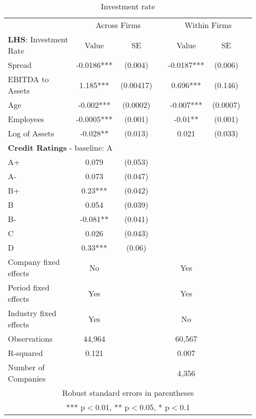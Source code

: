 \documentclass[12pt]{article}
\begin{document}
\author{Barnabás Székely}
\date{\today}
\vspace{-1in}

\begin{table}[H]
    \centering
    \caption{Investment rate}
    \small
    \label{tab:your_table_label}
    \begin{tabular}{lcccccc}
    \toprule
    & \multicolumn{3}{c}{Across Firms} & \multicolumn{3}{c}{Within Firms} \\
    \cmidrule(lr){2-4} \cmidrule(lr){5-7}
    \textbf{LHS}: Investment Rate & Value & SE & & Value & SE & \\
    \midrule
    Spread & -0.0186*** & (0.004) & & -0.0187*** & (0.006) & \\
    EBITDA to Assets & 1.185*** & (0.00417) & &  0.696*** & (0.146) & \\
    Age & -0.002*** & (0.0002) & & -0.007*** & (0.0007) & \\
    Employees & -0.0005*** & (0.001) & & -0.01** & (0.001) & \\
    Log of Assets & -0.028** & (0.013) & & 0.021 &  (0.033) & \vspace*{3mm} \\
    \multicolumn{7}{l}{\textbf{Credit Ratings} - baseline: A} \\
    A+  & 0.079 & (0.053) & & & & \\
    A-  & 0.073 & (0.047) & & & & \\
    B+  & 0.23*** & (0.042) & & & & \\
    B   & 0.054 & (0.039) & & & & \\
    B-  & -0.081** & (0.041) & & & & \\
    C   & 0.026 & (0.043) & & & & \\
    D   & 0.33*** & (0.06) & & & & \vspace{2mm} \\
    \hline
    Company fixed effects & No & & & Yes & & \\
    Period fixed effects & Yes & & & Yes & & \\
    Industry fixed effects & Yes & & & No & & \\
    Observations &  44,964 & & & 60,567 & & \\
    R-squared & 0.121 & & & 0.007 & & \\
    Number of Companies & & & & 4,356 & & \\
    \bottomrule
    \multicolumn{7}{c}{Robust standard errors in parentheses} \\
    \multicolumn{7}{c}{*** p$<$0.01, ** p$<$0.05, * p$<$0.1} \\
    \end{tabular}%
\end{table}
\end{document}
